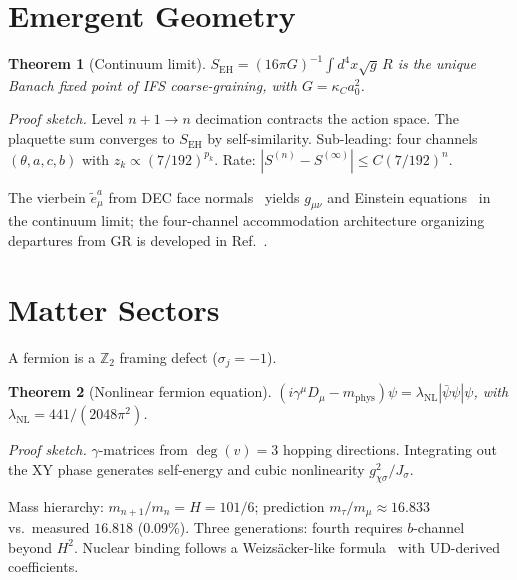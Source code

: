 \documentclass[11pt,twocolumn]{article}
\newtheorem{theorem}{Theorem}
\begin{document}
\section{Emergent Geometry}
\label{sec:geometry}

\begin{theorem}[Continuum limit]
\label{thm:continuum}
$S_{\mathrm{EH}}=(16\pi G)^{-1}\!\int\! d^4x\sqrt{g}\,R$ is the unique Banach fixed point of IFS coarse-graining, with $G=\kappa_C a_0^2$.
\end{theorem}
\textit{Proof sketch.}
Level $n{+}1\to n$ decimation contracts the action space.
The plaquette sum converges to $S_{\mathrm{EH}}$ by self-similarity.
Sub-leading: four channels $(\theta,a,c,b)$ with $z_k\propto(7/192)^{p_k}$.
Rate: $|S^{(n)}-S^{(\infty)}|\leq C(7/192)^n$.

The vierbein $\tilde{e}^a_\mu$ from DEC face normals~\cite{hirani2003} yields $g_{\mu\nu}$ and Einstein equations~\cite{einstein1915} in the continuum limit; the four-channel accommodation architecture organizing departures from GR is developed in Ref.~\cite{mayes2026grav}.

\section{Matter Sectors}
\label{sec:matter}

A fermion is a $\mathbb{Z}_2$ framing defect ($\sigma_j=-1$).

\begin{theorem}[Nonlinear fermion equation]
\label{thm:fermion}
$(i\gamma^\mu D_\mu - m_{\mathrm{phys}})\psi = \lambda_{\mathrm{NL}}|\bar\psi\psi|\psi$,
with $\lambda_{\mathrm{NL}}=441/(2048\pi^2)$.
\end{theorem}
\textit{Proof sketch.}
$\gamma$-matrices from $\deg(v)=3$ hopping directions.
Integrating out the XY phase generates self-energy and cubic nonlinearity $g_{\chi\sigma}^2/J_\sigma$.

Mass hierarchy: $m_{n+1}/m_n=H=101/6$; prediction $m_\tau/m_\mu\approx 16.833$ vs.\ measured $16.818$ (0.09\%).
Three generations: fourth requires $b$-channel beyond $H^2$.
Nuclear binding follows a Weizs\"acker-like formula~\cite{weizsacker1935} with UD-derived coefficients.

\end{document}
